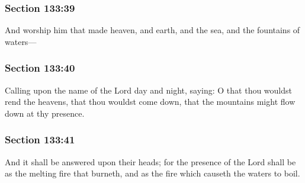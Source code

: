 	\subsubsection{Section 133:39} %
		\label{DC133-39}

		And worship him that made heaven, and earth, and the sea, and the fountains of waters---


	\subsubsection{Section 133:40} %
		\label{DC133-40}

		Calling upon the name of the Lord day and night, saying: O that thou wouldst rend the heavens, that thou wouldst come down, that the mountains might flow down at thy presence.


	\subsubsection{Section 133:41} %
		\label{DC133-41}

		And it shall be answered upon their heads; for the presence of the Lord shall be as the melting fire that burneth, and as the fire which causeth the waters to boil.


